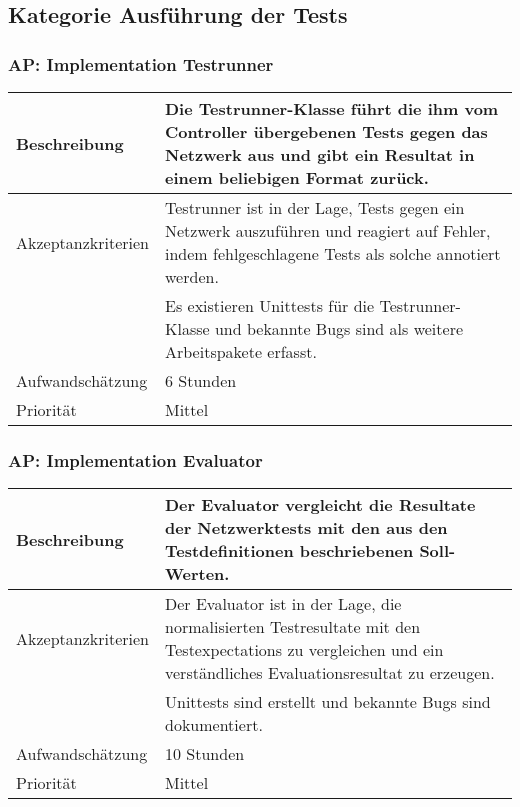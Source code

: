\documentclass[
	ngerman,
	toc=listof, %
	toc=bibliography, %
	footnotes=multiple, %
	parskip=half, %
	numbers=noendperiod %
]{scrartcl}
\begin{document}
	\subsection{Kategorie Ausführung der Tests}
	
	
	\subsubsection{AP: Implementation Testrunner}
	\begin{tabularx}{\textwidth}{lX}
		\toprule
		Beschreibung & Die Testrunner-Klasse führt die ihm vom Controller übergebenen Tests gegen das Netzwerk aus und gibt ein Resultat in einem beliebigen Format zurück.\\
		\midrule
		Akzeptanzkriterien & Testrunner ist in der Lage, Tests gegen ein Netzwerk auszuführen und reagiert auf Fehler, indem fehlgeschlagene Tests als solche annotiert werden.\\
		 & Es existieren Unittests für die Testrunner-Klasse und bekannte Bugs sind als weitere Arbeitspakete erfasst. \\
		\midrule
		Aufwandschätzung & 6 Stunden\\
		\midrule
		Priorität & Mittel \\
		\bottomrule
	\end{tabularx}

	\subsubsection{AP: Implementation Evaluator}
	\begin{tabularx}{\textwidth}{lX}
		\toprule
		Beschreibung & Der Evaluator vergleicht die Resultate der Netzwerktests mit den aus den Testdefinitionen beschriebenen Soll-Werten.\\
		\midrule
		Akzeptanzkriterien & Der Evaluator ist in der Lage, die normalisierten Testresultate mit den Testexpectations zu vergleichen und ein verständliches Evaluationsresultat zu erzeugen.\\
		 & Unittests sind erstellt und bekannte Bugs sind dokumentiert. \\
		\midrule
		Aufwandschätzung & 10 Stunden\\
		\midrule
		Priorität & Mittel \\
		\bottomrule
	\end{tabularx}
	\newpage
\end{document}
